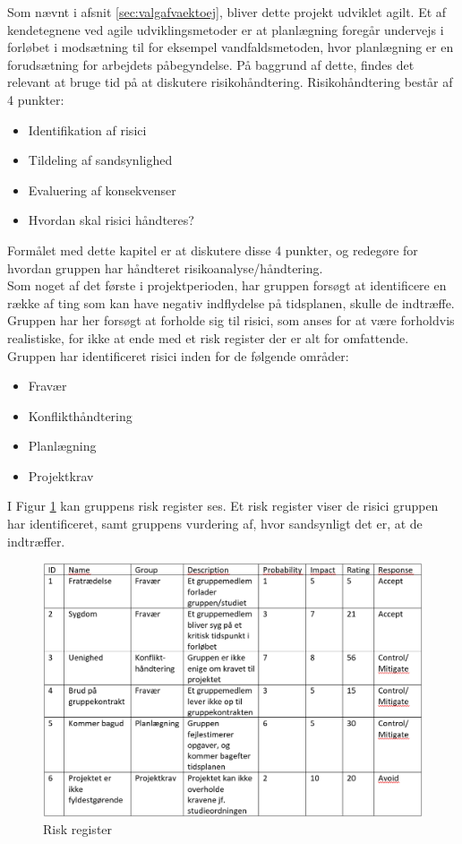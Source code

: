 Som nævnt i afsnit \ref{sec:valgafvaektoej}, bliver dette projekt udviklet agilt. Et af kendetegnene ved agile udviklingsmetoder er at 
planlægning foregår undervejs i forløbet i modsætning til for eksempel vandfaldsmetoden, hvor planlægning er en 
forudsætning for arbejdets påbegyndelse. På baggrund af dette, findes det relevant at bruge tid på at diskutere 
risikohåndtering. Risikohåndtering består af 4 punkter:

\begin{itemize}
    \item Identifikation af risici
    \item Tildeling af sandsynlighed
    \item Evaluering af konsekvenser
    \item Hvordan skal risici håndteres?
\end{itemize}

Formålet med dette kapitel er at diskutere disse 4 punkter, og redegøre for hvordan gruppen har håndteret risikoanalyse/håndtering. \\ 

Som noget af det første i projektperioden, har gruppen forsøgt at identificere en række af ting som kan have negativ indflydelse
på tidsplanen, skulle de indtræffe. Gruppen har her forsøgt at forholde sig til risici, som anses for at være forholdvis realistiske, for ikke
at ende med et risk register der er alt for omfattende. Gruppen har identificeret risici inden for de følgende områder:

\begin{itemize}
    \item Fravær
    \item Konflikthåndtering
    \item Planlægning
    \item Projektkrav
\end{itemize}

I Figur \ref{fig:riskregister} kan gruppens risk register ses. Et risk register viser de risici gruppen har identificeret, samt gruppens vurdering af, hvor sandsynligt det er, at de indtræffer.

\begin{figure}[!h]
    \centering
    \includegraphics[width=\textwidth]{figures/RiskRegister.png}
    \caption{Risk register}
    \label{fig:riskregister}
\end{figure}

